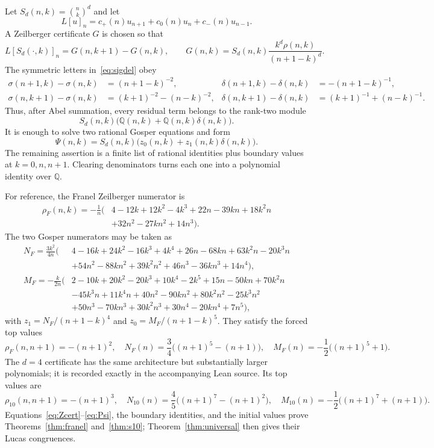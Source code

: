 \documentclass[11pt,reqno]{amsart}
\theoremstyle{definition}
\theoremstyle{remark}
\newcommand{\Q}{\mathbb Q}
\begin{document}
Let $S_d(n,k)=\binom nk^d$ and let
\[
 L[u]_n=c_+(n)u_{n+1}+c_0(n)u_n+c_-(n)u_{n-1}.
\]
A Zeilberger certificate $G$ is chosen so that
\begin{equation}\label{eq:Zcert}
 L[S_d(\cdot,k)]_n=G(n,k+1)-G(n,k),
 \qquad
 G(n,k)=S_d(n,k)\frac{k^d\rho(n,k)}{(n+1-k)^d}.
\end{equation}
The symmetric letters in~\eqref{eq:sigdel} obey
\begin{align}
 \sigma(n+1,k)-\sigma(n,k)&=(n+1-k)^{-2},&
 \delta(n+1,k)-\delta(n,k)&=-(n+1-k)^{-1},\label{eq:ndiff}\\
 \sigma(n,k+1)-\sigma(n,k)&=(k+1)^{-2}-(n-k)^{-2},&
 \delta(n,k+1)-\delta(n,k)&=(k+1)^{-1}+(n-k)^{-1}.\label{eq:kdiff}
\end{align}
Thus, after Abel summation, every residual term belongs to the rank-two module
\[
 S_d(n,k)\bigl(\Q(n,k)+\Q(n,k)\delta(n,k)\bigr).
\]
It is enough to solve two rational Gosper equations and form
\begin{equation}\label{eq:Psi}
 \Psi(n,k)=S_d(n,k)\bigl(z_0(n,k)+z_1(n,k)\delta(n,k)\bigr).
\end{equation}
The remaining assertion is a finite list of rational identities plus boundary
values at $k=0,n,n+1$.  Clearing denominators turns each one into a polynomial
identity over $\Q$.

For reference, the Franel Zeilberger numerator is
\begin{align}\label{eq:rhoF}
 \rho_F(n,k)=-\frac1n\bigl(&4-12k+12k^2-4k^3+22n-39kn+18k^2n\\
 &+32n^2-27kn^2+14n^3\bigr).
\end{align}
The two Gosper numerators may be taken as
\begin{align*}
N_F=\frac{3k^2}{4n}\bigl(&4-16k+24k^2-16k^3+4k^4+26n-68kn+63k^2n-20k^3n\\
 &+54n^2-88kn^2+39k^2n^2+46n^3-36kn^3+14n^4\bigr),\\
M_F=-\frac{k}{2n}\bigl(&2-10k+20k^2-20k^3+10k^4-2k^5+15n-50kn+70k^2n\\
 &-45k^3n+11k^4n+40n^2-90kn^2+80k^2n^2-25k^3n^2\\
 &+50n^3-70kn^3+30k^2n^3+30n^4-20kn^4+7n^5\bigr),
\end{align*}
with $z_1=N_F/(n+1-k)^4$ and $z_0=M_F/(n+1-k)^5$.
They satisfy the forced top values
\[
 \rho_F(n,n+1)=-(n+1)^2,
 \quad N_F(n)=\frac34\bigl((n+1)^5-(n+1)\bigr),
 \quad M_F(n)=-\frac12\bigl((n+1)^5+1\bigr).
\]
The $d=4$ certificate has the same architecture but substantially larger
polynomials; it is recorded exactly in the accompanying Lean source.  Its top
values are
\[
 \rho_{10}(n,n+1)=-(n+1)^3,
 \quad N_{10}(n)=\frac45\bigl((n+1)^7-(n+1)^2\bigr),
 \quad M_{10}(n)=-\frac12\bigl((n+1)^7+(n+1)\bigr).
\]
Equations~\eqref{eq:Zcert}--\eqref{eq:Psi}, the boundary identities, and the
initial values prove Theorems~\ref{thm:franel} and~\ref{thm:s10};
Theorem~\ref{thm:universal} then gives their Lucas congruences.
\end{document}
